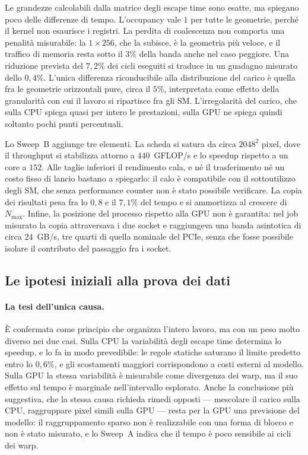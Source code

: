 Le grandezze calcolabili dalla matrice degli escape time sono esatte, ma spiegano
poco delle differenze di tempo. L'occupancy vale $1$ per tutte le geometrie,
perché il kernel non esaurisce i registri. La perdita di coalescenza non comporta
una penalità misurabile: la $1{\times}256$, che la subisce, è la geometria più
veloce, e il traffico di memoria resta sotto il $3\%$ della banda anche nel caso
peggiore. Una riduzione prevista del $7{,}2\%$ dei cicli eseguiti si traduce in
un guadagno misurato dello $0{,}4\%$. L'unica differenza riconducibile alla
distribuzione del carico è quella fra le geometrie orizzontali pure, circa il
$5\%$, interpretata come effetto della granularità con cui il lavoro si
ripartisce fra gli SM. L'irregolarità del carico, che sulla CPU spiega quasi per
intero le prestazioni, sulla GPU ne spiega quindi soltanto pochi punti
percentuali.

Lo Sweep~B aggiunge tre elementi. La scheda si satura da circa $2048^2$ pixel,
dove il throughput si stabilizza attorno a $440$~GFLOP/s e lo speedup rispetto a
un core a $152$. Alle taglie inferiori il rendimento cala, e né il trasferimento
né un costo fisso di lancio bastano a spiegarlo: il calo è compatibile con il
sottoutilizzo degli SM, che senza performance counter non è stato possibile
verificare. La copia dei risultati pesa fra lo $0{,}8$ e il $7{,}1\%$ del tempo e
si ammortizza al crescere di $N_{\max}$. Infine, la posizione del processo
rispetto alla GPU non è garantita: nel job misurato la copia attraversava i due
socket e raggiungeva una banda asintotica di circa $24$~GB/s, tre quarti di
quella nominale del PCIe, senza che fosse possibile isolare il contributo del
passaggio fra i socket.

\subsection{Le ipotesi iniziali alla prova dei dati}

\paragraph{La tesi dell'unica causa.}
È confermata come principio che organizza l'intero lavoro, ma con un peso molto
diverso nei due casi. Sulla CPU la variabilità degli escape time determina lo
speedup, e lo fa in modo prevedibile: le regole statiche saturano il limite
predetto entro lo $0{,}6\%$, e gli scostamenti maggiori corrispondono a costi
esterni al modello. Sulla GPU la stessa variabilità è misurabile come divergenza
dei warp, ma il suo effetto sul tempo è marginale nell'intervallo esplorato.
Anche la conclusione più suggestiva, che la stessa causa richieda rimedi opposti
--- mescolare il carico sulla CPU, raggruppare pixel simili sulla GPU --- resta
per la GPU una previsione del modello: il raggruppamento sparso non è
realizzabile con una forma di blocco e non è stato misurato, e lo Sweep~A indica
che il tempo è poco sensibile ai cicli dei warp.


